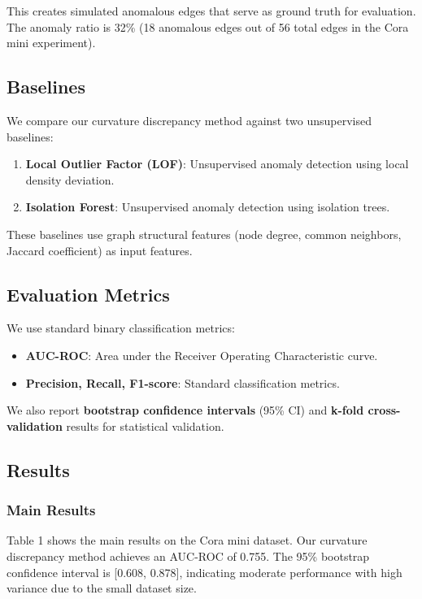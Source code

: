 \documentclass[11pt,letterpaper]{article}
\begin{document}
This creates simulated anomalous edges that serve as ground truth for evaluation. The anomaly ratio is 32\% (18 anomalous edges out of 56 total edges in the Cora mini experiment).

\subsection{Baselines}

We compare our curvature discrepancy method against two unsupervised baselines:

\begin{enumerate}
  \item \textbf{Local Outlier Factor (LOF)}: Unsupervised anomaly detection using local density deviation.
  \item \textbf{Isolation Forest}: Unsupervised anomaly detection using isolation trees.
\end{enumerate}

These baselines use graph structural features (node degree, common neighbors, Jaccard coefficient) as input features.

\subsection{Evaluation Metrics}

We use standard binary classification metrics:

\begin{itemize}
  \item \textbf{AUC-ROC}: Area under the Receiver Operating Characteristic curve.
  \item \textbf{Precision, Recall, F1-score}: Standard classification metrics.
\end{itemize}

We also report \textbf{bootstrap confidence intervals} (95\% CI) and \textbf{k-fold cross-validation} results for statistical validation.

\subsection{Results}

\subsubsection{Main Results}

Table 1 shows the main results on the Cora mini dataset. Our curvature discrepancy method achieves an AUC-ROC of 0.755. The 95\% bootstrap confidence interval is [0.608, 0.878], indicating moderate performance with high variance due to the small dataset size.
\end{document}
